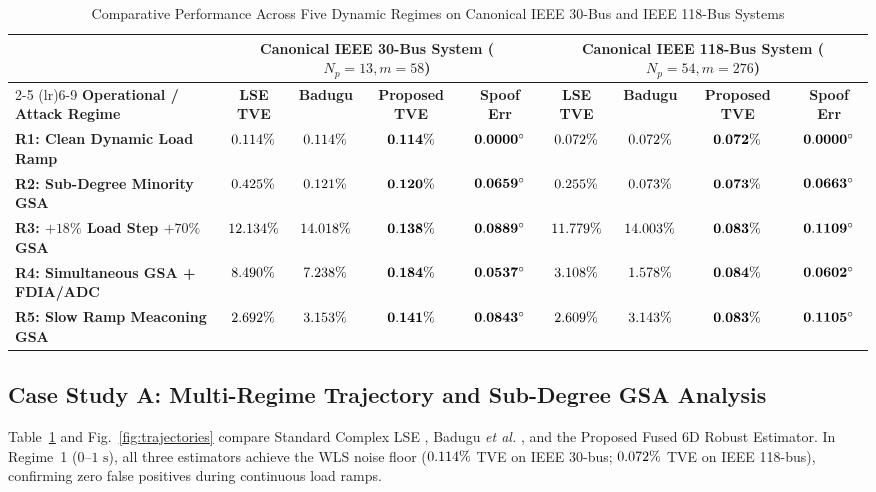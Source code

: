 \documentclass[journal,twoside]{IEEEtran}
\begin{document}
\begin{table}[!t]
\centering
\footnotesize
\caption{Comparative Performance Across Five Dynamic Regimes on Canonical IEEE 30-Bus and IEEE 118-Bus Systems}
\label{tab:main_results}
\begin{tabular}{lcccccccc}
\toprule
& \multicolumn{4}{c}{\textbf{Canonical IEEE 30-Bus System ($N_p = 13, m = 58$)}} & \multicolumn{4}{c}{\textbf{Canonical IEEE 118-Bus System ($N_p = 54, m = 276$)}} \\
\cmidrule(lr){2-5} \cmidrule(lr){6-9}
\textbf{Operational / Attack Regime} & \textbf{LSE TVE} & \textbf{Badugu \cite{badugu2026synchrophasor}} & \textbf{Proposed TVE} & \textbf{Spoof Err} & \textbf{LSE TVE} & \textbf{Badugu \cite{badugu2026synchrophasor}} & \textbf{Proposed TVE} & \textbf{Spoof Err} \\
\midrule
\textbf{R1: Clean Dynamic Load Ramp} & $0.114\%$ & $0.114\%$ & $\mathbf{0.114\%}$ & $\mathbf{0.0000^\circ}$ & $0.072\%$ & $0.072\%$ & $\mathbf{0.072\%}$ & $\mathbf{0.0000^\circ}$ \\
\textbf{R2: Sub-Degree Minority GSA} & $0.425\%$ & $0.121\%$ & $\mathbf{0.120\%}$ & $\mathbf{0.0659^\circ}$ & $0.255\%$ & $0.073\%$ & $\mathbf{0.073\%}$ & $\mathbf{0.0663^\circ}$ \\
\textbf{R3: $+18\%$ Load Step $+ 70\%$ GSA} & $12.134\%$ & $14.018\%$ & $\mathbf{0.138\%}$ & $\mathbf{0.0889^\circ}$ & $11.779\%$ & $14.003\%$ & $\mathbf{0.083\%}$ & $\mathbf{0.1109^\circ}$ \\
\textbf{R4: Simultaneous GSA + FDIA/ADC} & $8.490\%$ & $7.238\%$ & $\mathbf{0.184\%}$ & $\mathbf{0.0537^\circ}$ & $3.108\%$ & $1.578\%$ & $\mathbf{0.084\%}$ & $\mathbf{0.0602^\circ}$ \\
\textbf{R5: Slow Ramp Meaconing GSA} & $2.692\%$ & $3.153\%$ & $\mathbf{0.141\%}$ & $\mathbf{0.0843^\circ}$ & $2.609\%$ & $3.143\%$ & $\mathbf{0.083\%}$ & $\mathbf{0.1105^\circ}$ \\
\bottomrule
\end{tabular}
\end{table}

\subsection{Case Study A: Multi-Regime Trajectory and Sub-Degree GSA Analysis}
Table~\ref{tab:main_results} and Fig.~\ref{fig:trajectories} compare Standard Complex LSE \cite{phadke1986state}, Badugu \emph{et al.} \cite{badugu2026synchrophasor}, and the Proposed Fused 6D Robust Estimator. In Regime~1 ($0\text{--}1\text{~s}$), all three estimators achieve the WLS noise floor ($0.114\%$ TVE on IEEE 30-bus; $0.072\%$ TVE on IEEE 118-bus), confirming zero false positives during continuous load ramps.
\end{document}
